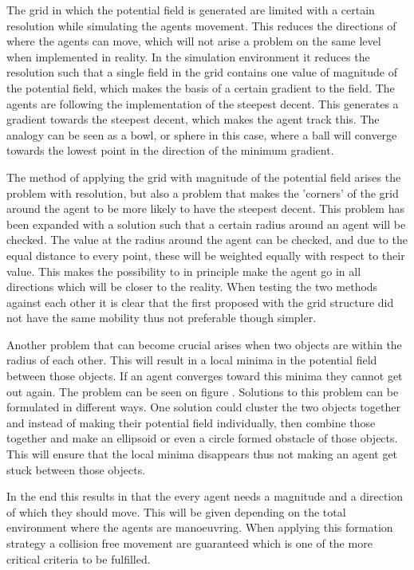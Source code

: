 The grid in which the potential field is generated are limited with a certain resolution while simulating the agents movement. This reduces the directions of where the agents can move, which will not arise a problem on the same level when implemented in reality. In the simulation environment it reduces the resolution such that a single field in the grid contains one value of magnitude of the potential field, which makes the basis of a certain gradient to the field. The agents are following the implementation of the steepest decent. This generates a gradient towards the steepest decent, which makes the agent track this. The analogy can be seen as a bowl, or sphere in this case, where a ball will converge towards the lowest point in the direction of the minimum gradient.

The method of applying the grid with magnitude of the potential field arises the problem with resolution, but also a problem that makes the 'corners' of the grid around the agent to be more likely to have the steepest decent. This problem has been expanded with a solution such that a certain radius around an agent will be checked. The value at the radius around the agent can be checked, and due to the equal distance to every point, these will be weighted equally with respect to their value. This makes the possibility to in principle make the agent go in all directions which will be closer to the reality. When testing the two methods against each other it is clear that the first proposed with the grid structure did not have the same mobility thus not preferable though simpler.

Another problem that can become crucial arises when two objects are within the radius of each other. This will result in a local minima in the potential field between those objects. If an agent converges toward this minima they cannot get out again. The problem can be seen on figure . Solutions to this problem can be formulated in different ways. One solution could cluster the two objects together and instead of making their potential field individually, then combine those together and make an ellipsoid or even a circle formed obstacle of those objects. This will ensure that the local minima disappears thus not making an agent get stuck between those objects.

In the end this results in that the every agent needs a magnitude and a direction of which they should move. This will be given depending on the total environment where the agents are manoeuvring. When applying this formation strategy a collision free movement are guaranteed which is one of the more critical criteria to be fulfilled. 
